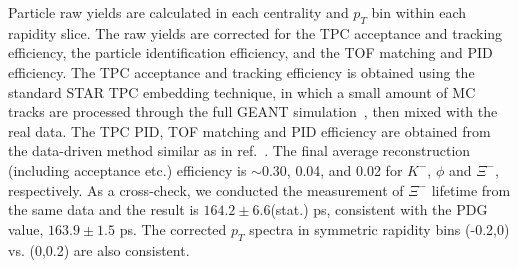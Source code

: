 \documentclass[aps,tightenlines,superscriptaddress,twocolumn]{revtex4-1}
\begin{document}
Particle raw yields are calculated in each centrality and $p_{T}$ bin within each rapidity slice. 
The raw yields are corrected for the TPC acceptance and tracking efficiency, %
the particle identification efficiency, %
and the TOF matching and PID efficiency. 
The TPC acceptance and tracking efficiency is obtained using the standard STAR TPC embedding technique, in which a small amount of MC tracks are processed through the full GEANT simulation~\cite{GEANT3:1994}, then mixed with the real data. The TPC PID, TOF matching and PID efficiency are obtained from the data-driven method similar as in ref.~\cite{STAR:HFTD0:2018zdy}.
The final average reconstruction (including acceptance etc.) efficiency is $\sim$0.30, 0.04, and 0.02 for $K^-$, $\phi$ and $\Xi^-$, respectively. As a cross-check, we conducted the measurement of $\Xi^{-}$ lifetime from the same data and the result is $164.2\pm6.6$(stat.) ps, consistent with the PDG value, $163.9\pm1.5$ ps. The corrected $p_T$ spectra in symmetric rapidity bins (-0.2,0) vs. (0,0.2) are also consistent.
\end{document}
